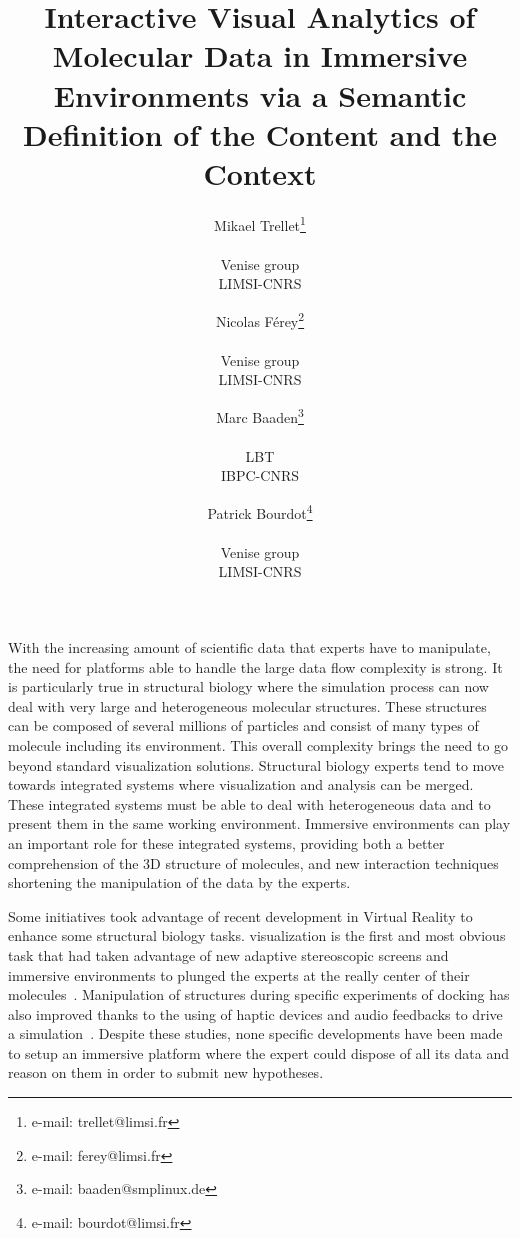 \documentclass{vgtc}                          %
\title{Interactive Visual Analytics of Molecular Data in Immersive Environments via a Semantic Definition of the Content and the Context}
\author{Mikael Trellet\thanks{e-mail: trellet@limsi.fr}\\ %
      \parbox{1.4in}{\scriptsize \centering Venise group \\ LIMSI-CNRS }%
\and Nicolas Férey\thanks{e-mail: ferey@limsi.fr}\\ %
     \parbox{1.4in}{\scriptsize \centering Venise group \\ LIMSI-CNRS }%
\and Marc Baaden\thanks{e-mail: baaden@smplinux.de}\\ %
     \parbox{1.4in}{\scriptsize \centering LBT \\ IBPC-CNRS}
\and Patrick Bourdot\thanks{e-mail: bourdot@limsi.fr}\\ %
     \parbox{1.4in}{\scriptsize \centering Venise group \\ LIMSI-CNRS }}%
\begin{document}


\maketitle



With the increasing amount of scientific data that experts have to manipulate, the need for platforms able to handle the large data flow complexity is strong. It is particularly true in structural biology where the simulation process can now deal with very large and heterogeneous molecular structures. These structures can be composed of several millions of particles and consist of many types of molecule including its environment. This overall complexity brings the need to go beyond standard visualization solutions.
Structural biology experts tend to move towards integrated systems where visualization and analysis can be merged. These integrated systems must be able to deal with heterogeneous data and to present them in the same working environment.
Immersive environments can play an important role for these integrated systems, providing both a better comprehension of the 3D structure of molecules, and new interaction techniques shortening the manipulation of the data by the experts.

Some initiatives took advantage of recent development in Virtual Reality to enhance some structural biology tasks. visualization is the first and most obvious task that had taken advantage of new adaptive stereoscopic screens and immersive environments to plunged the experts at the really center of their molecules~\cite{van2000immersive,stone_immersive_2010,odonoghue_visualization_2010,hirst2014molecular}. Manipulation of structures during specific experiments of docking has also improved thanks to the using of haptic devices and audio feedbacks to drive a simulation~\cite{ferey_multisensory_2009}. Despite these studies, none specific developments have been made to setup an immersive platform where the expert could dispose of all its data and reason on them in order to submit new hypotheses.
\end{document}

